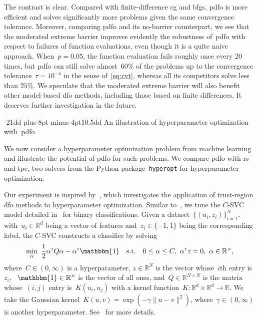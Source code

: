 \documentclass[
    smallextended,  %
    final,          %
]{svjour3}
\makeatletter
\newcommand{\trs}{{\scriptscriptstyle{\mathsf{T}}}}
\newcommand{\sn}{{\scriptscriptstyle{N}}}
\newcommand{\ones}{\mathbbm{1}}
\newcommand{\R}{\mathbb{R}}
\newcommand{\norm}[2][]{#1\lVert#2#1\rVert}
\newcommand{\st}{\text{s.t.}}
\def\subsection{\@startsection{subsection}{2}{\z@}%
    {-21dd plus-8pt minus-4pt}{10.5dd}
     {\normalsize\bfseries}}
\makeatother
\begin{document}
The contrast is clear.
Compared with finite-difference \gls{cg} and \gls{bfgs}, \gls{pdfo} is
more efficient and solves significantly more problems given the same convergence tolerance.
Moreover, comparing \gls{pdfo} and its no-barrier counterpart, we see that the moderated extreme barrier
improves evidently the robustness of~\gls{pdfo} with respect to failures of function evaluations,
even though it is a quite naive approach.
When~$p = 0.05$, the function evaluation fails roughly once every $20$ times,
but \gls{pdfo} can still solve almost~$60\%$ of the problems up to the convergence
tolerance~$\tau = 10^{-4}$ in the sense of~\eqref{eq:cvt}, whereas all its competitors solve less than $25\%$.
We speculate that the moderated extreme barrier will also benefit other model-based \gls{dfo} methods,
including those based on finite differences. It deserves further investigation in the future.


\subsection{An illustration of hyperparameter optimization with~\gls{pdfo}}
\label{ssec:hypertune}

We now consider a hyperparameter optimization problem from machine learning and illustrate the potential
of \gls{pdfo} for such problems.
We compare \gls{pdfo} with \gls{rs} and \gls{tpe}, two solvers
from the Python package~\texttt{hyperopt} for hyperparameter optimization.

Our experiment is inspired by~\cite[\S~5.3]{Ghanbari_Scheinberg_2017}, which investigates the
application of trust-region \gls{dfo} methods to hyperparameter optimization.
Similar to~\mbox{\cite[\S~5.3]{Ghanbari_Scheinberg_2017}},
we tune the $C$-SVC model detailed in~\cite[\S~2.1]{Chang_Lin_2011} for binary classifications.
Given a dataset~$\{(u_i,z_i)\}_{i=1}^\sn$, with~$u_i \in \R^d$ being a vector of features
and~$z_i \in \{-1,1\}$ being the corresponding label,
the $C$-SVC constructs a classifier by solving
\begin{equation}
    \label{eq:svc}
        \min_{\alpha} ~ \frac{1}{2} \alpha^\trs Q \alpha - \alpha^\trs \ones
        \quad \st \quad 0 \leq \alpha \leq C, ~ \alpha^\trs z = 0, ~\alpha \in\R^{\sn},
\end{equation}
where~$C\in(0,\infty)$ is a hyperparameter, $z\in\R^{\sn}$ is the vector whose~$i$th entry is~$z_i$,
~$\ones\in\R^\sn$
is the vector of all ones, and~$Q\in\R^{\sn\times \sn}$ is the matrix whose~$(i,j)$ entry is~$K(u_i,u_j)$
with a kernel function~$K\mathrel{:} \R^{d}\times\R^{d} \to \R$.
We take the Gaussian kernel~$K(u,v) = \exp(-\gamma\norm{u-v}^2)$, where~$\gamma \in (0,\infty)$ is
another hyperparameter.
See~\cite[\S~2.1]{Chang_Lin_2011} for more details.
\end{document}
